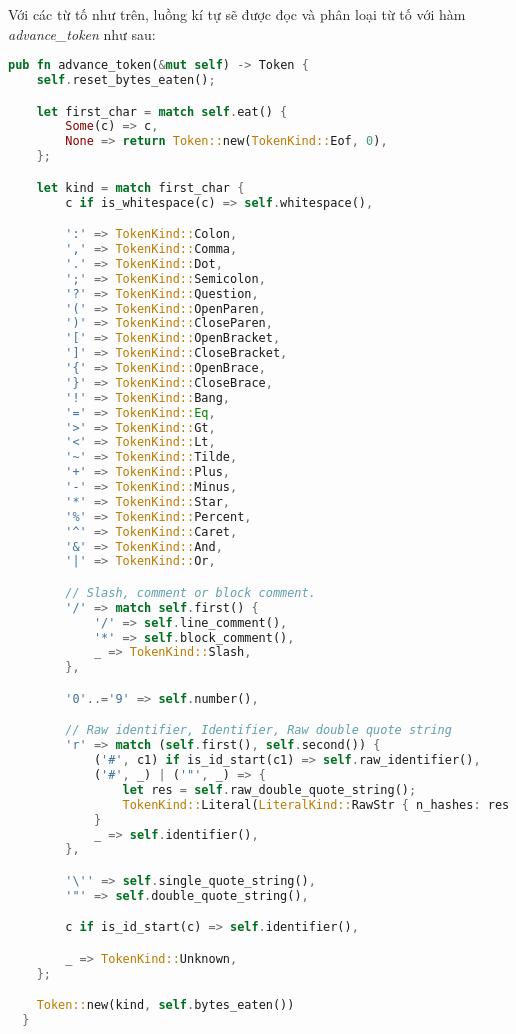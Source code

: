Với các từ tố như trên, luồng kí tự sẽ được đọc và phân loại từ tố với hàm \textit{advance\_token} như sau:
\begin{lstlisting}[language=Rust]
  pub fn advance_token(&mut self) -> Token {
    self.reset_bytes_eaten();

    let first_char = match self.eat() {
        Some(c) => c,
        None => return Token::new(TokenKind::Eof, 0),
    };

    let kind = match first_char {
        c if is_whitespace(c) => self.whitespace(),

        ':' => TokenKind::Colon,
        ',' => TokenKind::Comma,
        '.' => TokenKind::Dot,
        ';' => TokenKind::Semicolon,
        '?' => TokenKind::Question,
        '(' => TokenKind::OpenParen,
        ')' => TokenKind::CloseParen,
        '[' => TokenKind::OpenBracket,
        ']' => TokenKind::CloseBracket,
        '{' => TokenKind::OpenBrace,
        '}' => TokenKind::CloseBrace,
        '!' => TokenKind::Bang,
        '=' => TokenKind::Eq,
        '>' => TokenKind::Gt,
        '<' => TokenKind::Lt,
        '~' => TokenKind::Tilde,
        '+' => TokenKind::Plus,
        '-' => TokenKind::Minus,
        '*' => TokenKind::Star,
        '%' => TokenKind::Percent,
        '^' => TokenKind::Caret,
        '&' => TokenKind::And,
        '|' => TokenKind::Or,

        // Slash, comment or block comment.
        '/' => match self.first() {
            '/' => self.line_comment(),
            '*' => self.block_comment(),
            _ => TokenKind::Slash,
        },

        '0'..='9' => self.number(),

        // Raw identifier, Identifier, Raw double quote string
        'r' => match (self.first(), self.second()) {
            ('#', c1) if is_id_start(c1) => self.raw_identifier(),
            ('#', _) | ('"', _) => {
                let res = self.raw_double_quote_string();
                TokenKind::Literal(LiteralKind::RawStr { n_hashes: res.ok() })
            }
            _ => self.identifier(),
        },

        '\'' => self.single_quote_string(),
        '"' => self.double_quote_string(),

        c if is_id_start(c) => self.identifier(),

        _ => TokenKind::Unknown,
    };

    Token::new(kind, self.bytes_eaten())
  } 
\end{lstlisting}

